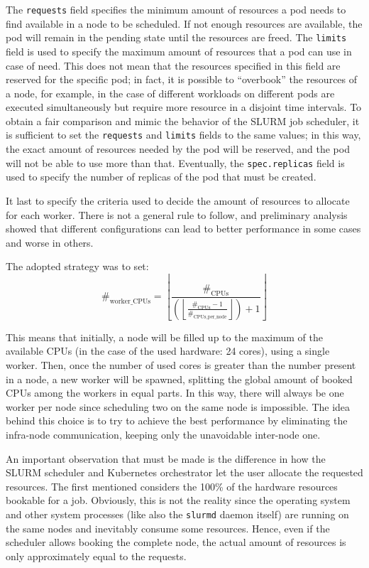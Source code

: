 The \texttt{requests} field specifies the minimum amount of resources a pod
needs to find available in a node to be scheduled. If not enough resources are
available, the pod will remain in the pending state until the resources are
freed.
The \texttt{limits} field is used to specify the maximum amount of resources
that a pod can use in case of need. This does not mean that the resources
specified in this field are reserved for the specific pod; in fact, it is
possible to ``overbook'' the resources of a node, for example, in the case of
different workloads on different pods are executed simultaneously but require
more resource in a disjoint time intervals.
To obtain a fair comparison and mimic the behavior of the SLURM job scheduler,
it is sufficient to set the \texttt{requests} and \texttt{limits} fields to the
same values; in this way, the exact amount of resources needed by the pod will
be reserved, and the pod will not be able to use more than that.
Eventually, the \texttt{spec.replicas} field is used to specify the number of
replicas of the pod that must be created.

It last to specify the criteria used to decide the amount of resources to
allocate for each worker. There is not a general rule to follow, and preliminary
analysis showed that different configurations can lead to better performance in
some cases and worse in others.

The adopted strategy was to set:
$$
\#_{\text{worker\_CPUs}} = \left\lfloor \frac{\#_{\text{CPUs}}}{\left( \left\lfloor
    \frac{\#_{\text{CPUs}} - 1}{\#_{\text{CPUs\_per\_node}}} \right\rfloor \right) + 1} \right\rfloor
$$

This means that initially, a node will be filled up to the maximum of the
available CPUs (in the case of the used hardware: 24 cores), using a single
worker.
Then, once the number of used cores is greater than the number present in a
node, a new worker will be spawned, splitting the global amount of booked CPUs
among the workers in equal parts. In this way, there will always be one worker
per node since scheduling two on the same node is impossible.
The idea behind this choice is to try to achieve the best performance by
eliminating the infra-node communication, keeping only the unavoidable
inter-node one.

An important observation that must be made is the difference in how the SLURM
scheduler and Kubernetes orchestrator let the user allocate the requested
resources.
The first mentioned considers the 100\% of the hardware resources bookable for a
job.
Obviously, this is not the reality since the operating system and other system
processes (like also the \texttt{slurmd} daemon itself) are running on the same
nodes and inevitably consume some resources.
Hence, even if the scheduler allows booking the complete node, the actual amount
of resources is only approximately equal to the requests.

